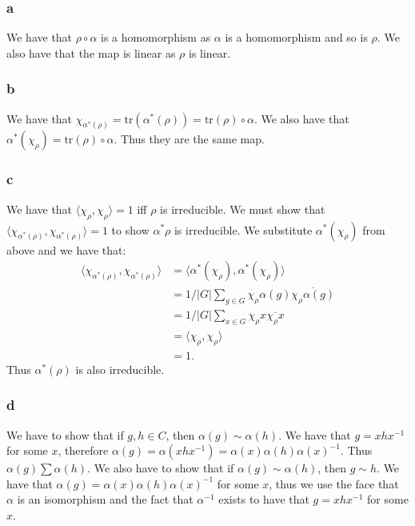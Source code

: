 \documentclass[]{article}
\newcommand{\tr}{\text{tr}}
\begin{document}
\subsubsection*{a}
We have that $\rho \circ \alpha$ is a homomorphism as $\alpha$ is a homomorphism and so is $\rho$. We also have that the map is linear as $\rho$ is linear.

\subsubsection*{b}
We have that $\chi_{\alpha^*(\rho)} = \tr(\alpha^*(\rho)) = \tr(\rho) \circ \alpha$. 
We also have that $\alpha^*(\chi_\rho) = \tr(\rho) \circ \alpha$. Thus they are the same map.

\subsubsection*{c}
We have that $ \langle \chi_\rho , \chi_\rho \rangle = 1$ iff $\rho$ is irreducible. We must show that $\langle \chi_{\alpha^*(\rho)}, \chi_{\alpha^*(\rho)} \rangle = 1$ to show $\alpha^*\rho$ is irreducible. We substitute $\alpha^*(\chi_\rho)$ from above and we have that:
\begin{align*}
	\langle \chi_{\alpha^*(\rho)}, \chi_{\alpha^*(\rho)} \rangle
	&=\langle \alpha^*(\chi_\rho), \alpha^*(\chi_\rho) \rangle \\
	&= 1/|G| \sum_{g \in G} \chi_\rho \alpha(g) \overline{\chi_\rho \alpha(g)} \\
	&= 1/|G| \sum_{x \in G} \chi_\rho x \overline{\chi_\rho x} \\
	&= \langle \chi_\rho , \chi_\rho \rangle \\
	&= 1.
\end{align*}
Thus $\alpha^*(\rho)$ is also irreducible.
\subsubsection*{d}
We have to show that if $g, h \in C$, then $\alpha(g) \sim \alpha(h)$. We have that $g = xhx^{-1}$ for some $x$, therefore $\alpha(g) = \alpha(xhx^{-1}) = \alpha(x) \alpha(h) \alpha(x)^{-1}$. Thus $\alpha(g) \sum \alpha(h)$. We also have to show that if $\alpha(g) \sim \alpha(h)$, then $g \sim h$. We have that $\alpha(g) = \alpha(x) \alpha(h) \alpha(x)^{-1}$ for some $x$, thus we use the face that $\alpha$ is an isomorphism and the fact that $\alpha^{-1}$ exists to have that $g = xhx^{-1}$ for some $x$. 
\end{document}
